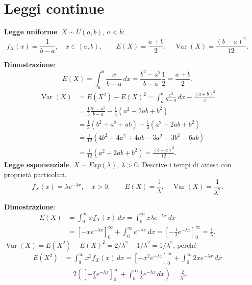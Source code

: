 \documentclass[11pt,a4paper]{article}
\newcommand{\pagina}[1]{\clearpage}
\begin{document}
\section*{Leggi continue}
\textbf{Legge uniforme}. $X\sim U(a,b)$, $a<b$:
\[\boxed{f_X(x)=\frac1{b-a}},\quad x\in(a,b),\qquad \boxed{E(X)=\frac{a+b}2,\quad\operatorname{Var}(X)=\frac{(b-a)^2}{12}}.\]
\begin{center}\end{center}
\textbf{Dimostrazione}:
\[E(X)=\int_a^b\frac{x}{b-a}\,dx=\frac{b^2-a^2}{b-a}\frac12=\frac{a+b}2.\]
\begin{align*}
\operatorname{Var}(X)&=E(X^2)-E(X)^2=\int_a^b\frac{x^2}{b-a}\,dx-\frac{(a+b)^2}4\\
&=\frac13\frac{b^3-a^3}{b-a}-\frac14(a^2+2ab+b^2)\\
&=\frac13(b^2+a^2+ab)-\frac14(a^2+2ab+b^2)\\
&=\frac1{12}(4b^2+4a^2+4ab-3a^2-3b^2-6ab)\\
&=\frac1{12}(a^2-2ab+b^2)=\frac{(b-a)^2}{12}.
\end{align*}
\pagina{29}\textbf{Legge esponenziale}. $X\sim Exp(\lambda)$, $\lambda>0$. Descrive i tempi di attesa con proprietà particolari.
\[\boxed{f_X(x)=\lambda e^{-\lambda x}},\quad x>0,\qquad\boxed{E(X)=\frac1\lambda,\quad\operatorname{Var}(X)=\frac1{\lambda^2}}.\]
\begin{center}\end{center}
\textbf{Dimostrazione}:
\begin{align*}
E(X)&=\int_0^\infty xf_X(x)\,dx=\int_0^\infty x\lambda e^{-\lambda x}\,dx\\
&=\left[-xe^{-\lambda x}\right]_0^\infty+\int_0^\infty e^{-\lambda x}\,dx=\left[-\frac1\lambda e^{-\lambda x}\right]_0^\infty=\frac1\lambda.
\end{align*}
$\operatorname{Var}(X)=E(X^2)-E(X)^2=2/\lambda^2-1/\lambda^2=1/\lambda^2$, perché
\begin{align*}
E(X^2)&=\int_0^\infty x^2f_X(x)\,dx=\left[-x^2e^{-\lambda x}\right]_0^\infty+\int_0^\infty2xe^{-\lambda x}\,dx\\
&=2\left(\left[-\frac{x}{\lambda}e^{-\lambda x}\right]_0^\infty+\int_0^\infty\frac1\lambda e^{-\lambda x}\,dx\right)=\frac2{\lambda^2}.
\end{align*}
\end{document}
